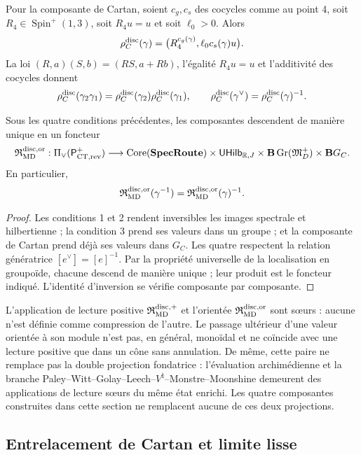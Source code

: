 Pour la composante de Cartan, soient \(c_g,c_s\) des cocycles comme au point 4,
soit \(R_4\in\operatorname{Spin}^{+}(1,3)\), soit \(R_4u=u\) et soit
\(\ell_0>0\). Alors
\[
 \rho_C^{\rm disc}(\gamma)
 =\bigl(R_4^{c_g(\gamma)},\ell_0c_s(\gamma)u\bigr).
\]
La loi
\((R,a)(S,b)=(RS,a+Rb)\), l'égalité \(R_4u=u\) et l'additivité des
cocycles donnent
\[
 \rho_C^{\rm disc}(\gamma_2\gamma_1)
 =\rho_C^{\rm disc}(\gamma_2)\rho_C^{\rm disc}(\gamma_1),
 \qquad
 \rho_C^{\rm disc}(\gamma^\vee)
 =\rho_C^{\rm disc}(\gamma)^{-1}.
\]

\begin{theorem}
\label{thm:int68-realizacion-orientada}
Sous les quatre conditions précédentes, les composantes descendent de manière
unique en un foncteur
\[
 \mathfrak R_{\rm MD}^{\rm disc,or}:
 \Pi_\vee(\mathsf P_{{\rm CT},{\rm rev}}^+)
 \longrightarrow
 \operatorname{Core}(\mathbf{SpecRoute})
 \times\mathsf{UHilb}_{\mathbb R,J}
 \times\mathbf B\operatorname{Gr}(\mathfrak M_D^+)
 \times\mathbf BG_C.
\]
En particulier,
\[
 \mathfrak R_{\rm MD}^{\rm disc,or}(\gamma^{-1})
 =\mathfrak R_{\rm MD}^{\rm disc,or}(\gamma)^{-1}.
\]
\end{theorem}

\begin{proof}
Les conditions 1 et 2 rendent inversibles les images spectrale et
hilbertienne ; la condition 3 prend ses valeurs dans un groupe ; et la composante de Cartan
prend déjà ses valeurs dans \(G_C\). Les quatre respectent la relation génératrice
\([e^\vee]=[e]^{-1}\). Par la propriété universelle de la localisation en
groupoïde, chacune descend de manière unique ; leur produit est le foncteur
indiqué. L'identité d'inversion se vérifie composante par composante.
\end{proof}

L'application de lecture positive \(\mathfrak R_{\rm MD}^{\rm disc,+}\) et l'orientée
\(\mathfrak R_{\rm MD}^{\rm disc,or}\) sont sœurs : aucune n'est définie comme
compression de l'autre. Le passage ultérieur d'une valeur orientée à son module n'est
pas, en général, monoïdal et ne coïncide avec une lecture positive que dans un cône
sans annulation. De même, cette paire ne remplace pas la double projection
fondatrice : l'évaluation archimédienne et la branche
Paley--Witt--Golay--Leech--\(V^\natural\)--Monstre--Moonshine demeurent
des applications de lecture sœurs du même état enrichi. Les quatre composantes
construites dans cette section ne remplacent aucune de ces deux projections.

\subsection{Entrelacement de Cartan et limite lisse}

